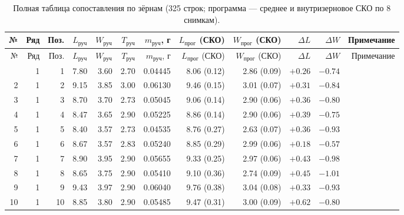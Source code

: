 \begin{longtable}{@{}rrrrrrrrrrrr@{}}
\caption{Полная таблица сопоставления по зёрнам (325 строк; программа — среднее
и внутризерновое СКО по 8 снимкам).}\label{tab:full}\\
\toprule
№ & Ряд & Поз. & $L_{\text{руч}}$ & $W_{\text{руч}}$ & $T_{\text{руч}}$ &
$m_{\text{руч}}$, г & $L_{\text{прог}}$ (СКО) & $W_{\text{прог}}$ (СКО) &
$\Delta L$ & $\Delta W$ & Примечание \\
\midrule
\endfirsthead
\toprule
№ & Ряд & Поз. & $L_{\text{руч}}$ & $W_{\text{руч}}$ & $T_{\text{руч}}$ &
$m_{\text{руч}}$, г & $L_{\text{прог}}$ (СКО) & $W_{\text{прог}}$ (СКО) &
$\Delta L$ & $\Delta W$ & Примечание \\
\midrule
\endhead
\bottomrule
\endfoot
1 & 1 & 1 & \num{7.80} & \num{3.60} & \num{2.70} & \num{0.04445} & \num{8.06} (\num{0.12}) & \num{2.86} (\num{0.09}) & $+\num{0.26}$ & $-\num{0.74}$ &  \\
2 & 1 & 2 & \num{9.15} & \num{3.85} & \num{3.00} & \num{0.06130} & \num{9.46} (\num{0.15}) & \num{3.01} (\num{0.07}) & $+\num{0.31}$ & $-\num{0.84}$ &  \\
3 & 1 & 3 & \num{8.70} & \num{3.70} & \num{2.73} & \num{0.05045} & \num{9.06} (\num{0.14}) & \num{2.90} (\num{0.06}) & $+\num{0.36}$ & $-\num{0.80}$ &  \\
4 & 1 & 4 & \num{8.47} & \num{3.65} & \num{2.90} & \num{0.05225} & \num{8.86} (\num{0.14}) & \num{2.90} (\num{0.06}) & $+\num{0.39}$ & $-\num{0.75}$ &  \\
5 & 1 & 5 & \num{8.40} & \num{3.57} & \num{2.73} & \num{0.04535} & \num{8.76} (\num{0.27}) & \num{2.63} (\num{0.07}) & $+\num{0.36}$ & $-\num{0.93}$ &  \\
6 & 1 & 6 & \num{8.67} & \num{3.57} & \num{2.83} & \num{0.05240} & \num{8.85} (\num{0.29}) & \num{2.99} (\num{0.06}) & $+\num{0.18}$ & $-\num{0.57}$ &  \\
7 & 1 & 7 & \num{8.90} & \num{3.95} & \num{2.90} & \num{0.05655} & \num{9.33} (\num{0.25}) & \num{2.97} (\num{0.06}) & $+\num{0.43}$ & $-\num{0.98}$ &  \\
8 & 1 & 8 & \num{8.65} & \num{3.75} & \num{2.90} & \num{0.05410} & \num{9.10} (\num{0.36}) & \num{2.74} (\num{0.09}) & $+\num{0.45}$ & $-\num{1.01}$ &  \\
9 & 1 & 9 & \num{9.43} & \num{3.97} & \num{2.90} & \num{0.06040} & \num{9.76} (\num{0.38}) & \num{3.04} (\num{0.08}) & $+\num{0.33}$ & $-\num{0.93}$ &  \\
10 & 1 & 10 & \num{8.85} & \num{3.80} & \num{2.90} & \num{0.05485} & \num{9.47} (\num{0.31}) & \num{3.00} (\num{0.09}) & $+\num{0.62}$ & $-\num{0.80}$ &  \\

\end{longtable}
